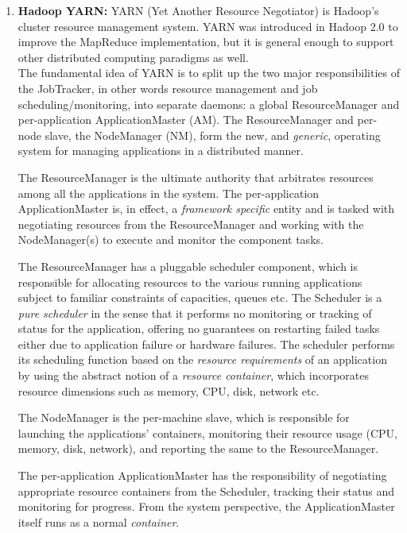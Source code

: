 \documentclass[conference]{IEEEtran}
\begin{document}
\begin{enumerate}
        \item \textbf{Hadoop YARN:}
            YARN (Yet Another Resource Negotiator) is Hadoop’s cluster resource management
system. YARN was introduced in Hadoop 2.0 to improve the MapReduce implementation,
but it is general enough to support other distributed computing paradigms
as well.\\

The fundamental idea of YARN is to split up the two major responsibilities of the JobTracker,
in other words resource management and job scheduling/monitoring, into separate daemons: a
global ResourceManager and per-application ApplicationMaster (AM). The ResourceManager
and per-node slave, the NodeManager (NM), form the new, and \textit{generic}, operating system for
managing applications in a distributed manner. 

The ResourceManager is the ultimate authority that arbitrates resources among all the
applications in the system. The per-application ApplicationMaster is, in effect, a \textit{framework
specific} entity and is tasked with negotiating resources from the ResourceManager and working
with the NodeManager(s) to execute and monitor the component tasks.

The ResourceManager has a pluggable scheduler component, which is responsible for
allocating resources to the various running applications subject to familiar constraints of
capacities, queues etc. The Scheduler is a \textit{pure scheduler} in the sense that it performs no
monitoring or tracking of status for the application, offering no guarantees on restarting failed
tasks either due to application failure or hardware failures. The scheduler performs its
scheduling function based on the \textit{resource requirements} of an application by using the abstract
notion of a \textit{resource container}, which incorporates resource dimensions such as memory, CPU,
disk, network etc. 

The NodeManager is the per-machine slave, which is responsible for launching the
applications’ containers, monitoring their resource usage (CPU, memory, disk, network), and
reporting the same to the ResourceManager. 

The per-application ApplicationMaster has the responsibility of negotiating appropriate
resource containers from the Scheduler, tracking their status and monitoring for progress. From
the system perspective, the ApplicationMaster itself runs as a normal \textit{container}.


\end{enumerate}
\end{document}
